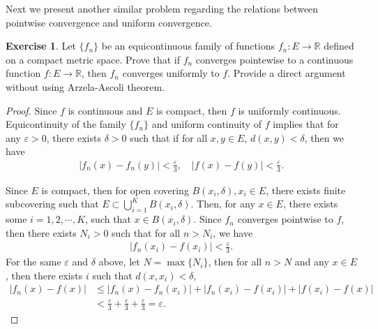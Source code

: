 \documentclass[11pt]{article}
\theoremstyle{definition}
\newtheorem{exercise}{Exercise}[problem]
\theoremstyle{definition}
\begin{document}
\medskip

Next we present another similar problem regarding the relations between pointwise convergence and uniform convergence.

\begin{exercise}
Let $\{f_n\}$ be an equicontinuous family of functions $f_n: E \to \mathbb{R}$ defined on a compact metric space. Prove that if $f_n$ converges pointewise to a continuous function $f: E \to \mathbb{R}$, then $f_n$ converges uniformly to $f$. Provide a direct argument without using Arzela-Ascoli theorem.
\end{exercise}
\begin{proof}
Since $f$ is continuous and $E$ is compact, then $f$ is uniformly continuous. Equicontinuity of the family $\{f_n\}$ and uniform continuity of $f$ implies that for any $\varepsilon > 0$, there exists $\delta > 0$ such that if for all $x, y \in E$, $d(x,y) < \delta$, then we have
\begin{align*}
    \left|f_n(x) - f_n(y)\right| < \frac{\varepsilon}{3}, \quad \left|f(x) - f(y)\right| < \frac{\varepsilon}{3}.
\end{align*}

Since $E$ is compact, then for open covering $B(x_i, \delta), x_i \in E$, there exists finite subcovering such that $E \subset \bigcup^K_{i=1} B(x_i, \delta)$. Then, for any $x \in E$, there exists some $i = 1, 2, \cdots, K$, such that $x \in B(x_i, \delta)$. Since $f_n$ converges pointwise to $f$, then there exists $N_i > 0$ such that for all $n > N_i$, we have
\begin{align*}
    \left|f_n(x_i) - f(x_i)\right| < \frac{\varepsilon}{3}.
\end{align*}
For the same $\varepsilon$ and $\delta$ above, let $N = \max\{N_i\}$, then for all $n > N$ and any $x \in E$, then there exists $i$ such that $d(x, x_i) < \delta$,
\begin{align*}
    \left|f_n(x) - f(x)\right| & \leq \left|f_n(x) - f_n(x_i)\right| + \left|f_n(x_i) - f(x_i)\right| + \left|f(x_i) - f(x)\right| \\
    & < \frac{\varepsilon}{3} + \frac{\varepsilon}{3} + \frac{\varepsilon}{3} = \varepsilon.
\end{align*}
\end{proof}

\medskip
\end{document}
